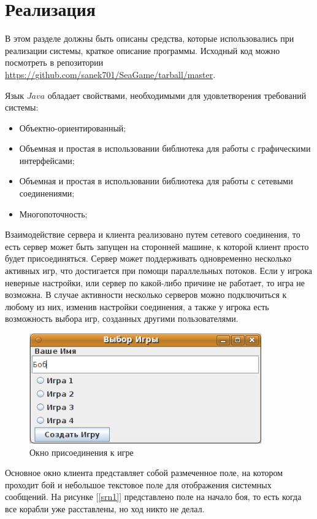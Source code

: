 ﻿\section{Реализация}
В этом разделе должны быть описаны средства, которые использовались при реализации системы, краткое описание программы. Исходный код можно посмотреть в репозитории \href{https://github.com/sanek701/SeaGame/tarball/master}{https://github.com/sanek701/SeaGame/tarball/master}.

Язык $Java$ обладает свойствами, необходимыми для удовлетворения требований системы:
		\begin{itemize}		
			\item Объектно-ориентированный;
			\item Объемная и простая в использовании библиотека для работы с графическими интерфейсами;
			\item Объемная и простая в использовании библиотека для работы с сетевыми соединениями;
			\item Многопоточность;
		\end{itemize}

Взаимодействие сервера и клиента реализовано путем сетевого соединения, то есть сервер может быть запущен на сторонней машине, к которой клиент просто будет присоединяться. Сервер может поддерживать одновременно несколько активных игр, что достигается при помощи параллельных потоков. Если у игрока неверные настройки, или сервер по какой-либо причине не работает, то игра не возможна. В случае активности несколько серверов можно подключиться к любому из них, изменив настройки соединения, а также у игрока есть возможность выбора игр, созданных другими пользователями. 
\begin{figure}[ht]
\centering
\includegraphics[width=10cm]{images/srn2.png}
\caption{Окно присоединения к игре}
\label{srn2}
\end{figure}

Основное окно клиента представляет собой размеченное поле, на котором проходит бой и небольшое текстовое поле для отображения системных сообщений. На рисунке [\ref{srn1}] представлено поле на начало боя, то есть когда все корабли уже расставлены, но ход никто не делал.

